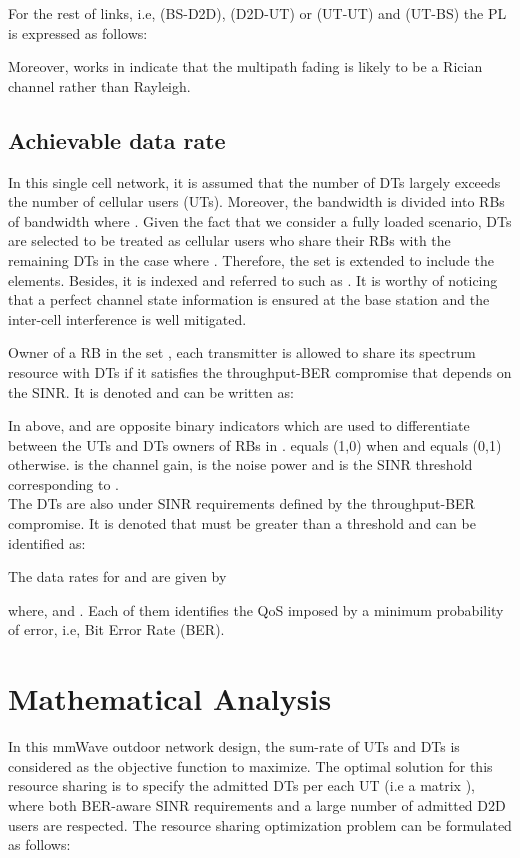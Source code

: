 \documentclass[conference,onecolumn,12pt]{IEEEtran}
\begin{document}
For the rest of links, i.e, (BS-D2D), (D2D-UT) or (UT-UT) and (UT-BS) the PL is expressed as follows:

Moreover, works in \cite{Rice1} indicate that the multipath fading is likely to be a Rician channel rather than Rayleigh.
\subsection{Achievable data rate}
In this single cell network, it is assumed that the number of DTs largely exceeds the number of cellular users (UTs). Moreover, the bandwidth is divided into  RBs of bandwidth  where . Given the fact that we consider a fully loaded scenario,  DTs are selected to be treated as cellular users who share their RBs with the remaining DTs in the case where . Therefore, the set  is extended to include the  elements. Besides, it is indexed  and referred to  such as . It is worthy of noticing that a perfect channel state information is ensured at the base station and the inter-cell interference is well mitigated.

Owner of a RB in the set , each transmitter is allowed to share its spectrum resource with DTs if it satisfies the throughput-BER compromise that depends on the SINR. It is denoted  and can be written as:

In above,  and  are opposite binary indicators which are used to differentiate between the UTs and DTs owners of RBs in .  equals (1,0) when  and  equals (0,1) otherwise.  is the channel gain,  is the noise power and  is the SINR threshold corresponding to .\\
The DTs are also under SINR requirements defined by the throughput-BER compromise. It is denoted  that must be greater than a threshold  and can be identified as:

The data rates for  and  are given by


where,  and . Each of them identifies the QoS imposed by a minimum probability of error, i.e, Bit Error Rate (BER).
\section{Mathematical Analysis}
In this mmWave outdoor network design, the sum-rate of UTs and DTs is considered as the objective function to maximize. The optimal solution for this resource sharing is to specify the admitted DTs per each UT (i.e a matrix ), where both BER-aware SINR requirements and a large number of admitted D2D users are respected.
The resource sharing optimization problem can be formulated as follows:
\end{document}
